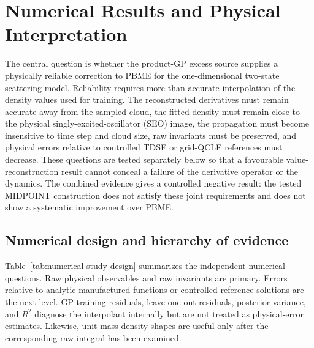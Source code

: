 \chapter{Numerical Results and Physical Interpretation}
\label{chap:results}

The central question is whether the product-GP excess source supplies a
physically reliable correction to PBME for the one-dimensional two-state
scattering model. Reliability requires more than accurate interpolation of
the density values used for training. The reconstructed derivatives must
remain accurate away from the sampled cloud, the fitted density must remain
close to the physical singly-excited-oscillator (SEO) image, the propagation
must become insensitive to time step and cloud size, raw invariants must be
preserved, and physical errors relative to controlled TDSE or grid-QCLE
references must decrease. These questions are tested separately below so that
a favourable value-reconstruction result cannot conceal a failure of the
derivative operator or the dynamics. The combined evidence gives a controlled
negative result: the tested MIDPOINT construction does not satisfy these joint
requirements and does not show a systematic improvement over PBME.

\section{Numerical design and hierarchy of evidence}
\label{sec:results-design}

Table~\ref{tab:numerical-study-design} summarizes the independent numerical
questions. Raw physical observables and raw invariants are primary. Errors
relative to analytic manufactured functions or controlled reference solutions
are the next level. GP training residuals, leave-one-out residuals, posterior
variance, and \(R^2\) diagnose the interpolant internally but are not treated
as physical-error estimates. Likewise, unit-mass density shapes are useful
only after the corresponding raw integral has been examined.

